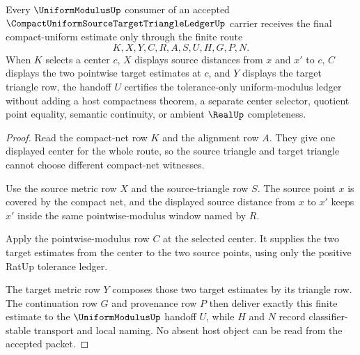 \begin{theorem}
\label{thm:compact-uniform-source-target-triangle-ledger-final-estimate}
Every $\UniformModulusUp$ consumer of an accepted
$\CompactUniformSourceTargetTriangleLedgerUp$ carrier receives the final
compact-uniform estimate only through the finite route
$$
K,X,Y,C,R,A,S,U,H,G,P,N .
$$
When $K$ selects a center $c$, $X$ displays source distances from $x$ and
$x'$ to $c$, $C$ displays the two pointwise target estimates at $c$, and $Y$
displays the target triangle row, the handoff $U$ certifies the
tolerance-only uniform-modulus ledger without adding a host compactness theorem,
a separate center selector, quotient point equality, semantic continuity, or
ambient $\RealUp$ completeness.
\end{theorem}
\begin{proof}
Read the compact-net row $K$ and the alignment row $A$. They give one displayed
center for the whole route, so the source triangle and target triangle cannot
choose different compact-net witnesses.

Use the source metric row $X$ and the source-triangle row $S$. The source point
$x$ is covered by the compact net, and the displayed source distance from $x$
to $x'$ keeps $x'$ inside the same pointwise-modulus window named by $R$.

Apply the pointwise-modulus row $C$ at the selected center. It supplies the two
target estimates from the center to the two source points, using only the
positive RatUp tolerance ledger.

The target metric row $Y$ composes those two target estimates by its triangle
row. The continuation row $G$ and provenance row $P$ then deliver exactly this
finite estimate to the $\UniformModulusUp$ handoff $U$, while $H$ and $N$
record classifier-stable transport and local naming. No absent host object can
be read from the accepted packet.
\end{proof}


